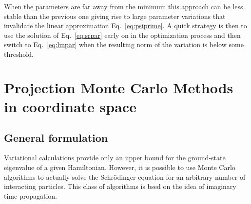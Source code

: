 When the parameters are far away from the minimum this approach can be less stable 
than the previous one giving rise to large parameter variations that
invalidate the linear approximation Eq.~\ref{eq:psiprime}. A quick strategy is then to use 
the solution of Eq.~\eqref{eq:srpar} early on in the optimization process and then switch to
Eq.~\eqref{eq:lmpar} when the resulting norm of the variation is below some threshold.

\section{Projection Monte Carlo Methods in coordinate space}
\subsection{General formulation}
\label{sec:generaldmc}
Variational calculations provide only an upper bound for the ground-state eigenvalue of a 
given Hamiltonian. However, it is possible to use Monte Carlo algorithms to actually solve
the Schr\"odinger equation for an arbitrary number of interacting particles. This class of algorithms is bsed on the idea of imaginary time propagation.

